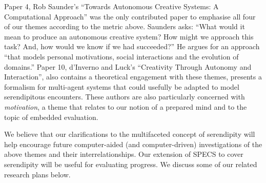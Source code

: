 \medskip



\bigskip

Paper 4, Rob Saunder's \citeyear{saunders2012towards} ``Towards
Autonomous Creative Systems: A Computational Approach'' was the only
contributed paper to emphasise all four of our themes according to the
metric above.  Saunders asks: ``What would it mean to produce an
autonomous creative system? How might we approach this task? And, how
would we know if we had succeeded?''  He argues for an approach ``that
models personal motivations, social interactions and the evolution of
domains.''  Paper 10, d'Inverno and Luck's \citeyear{d2012creativity}
``Creativity Through Autonomy and Interaction'', also contains a
theoretical engagement with these themes, presents a formalism for
multi-agent systems that could usefully be adapted to model
serendipitous encounters.  These authors are also particularly
concerned with \emph{motivation}, a theme that relates to our notion
of a prepared mind and to the topic of embedded evaluation.

We believe that our clarifications to the multifaceted concept of
serendipity will help encourage future computer-aided (and
computer-driven) investigations of the above themes and their
interrelationships.  Our extension of SPECS to cover serendipity will
be useful for evaluating progress.  We discuss some of our related
research plans below.
